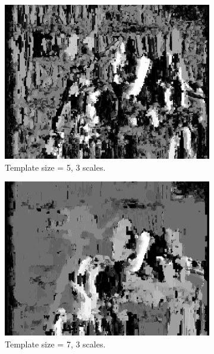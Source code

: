 \documentclass[12pt,a4paper,oneside,final]{article}
\begin{document}
\begin{figure}[H]
\ContinuedFloat
\begin{subfigure}[b]{0.24\textwidth}
	\includegraphics[width=\textwidth]{disparity_s3_k5set_1.png}
	\caption{Template size = 5, 3 scales.}
\end{subfigure}
\begin{subfigure}[b]{0.24\textwidth}
	\includegraphics[width=\textwidth]{disparity_s3_k7set_1.png}
	\caption{Template size = 7, 3 scales.}
\end{subfigure}
\begin{subfigure}[b]{0.24\textwidth}

\end{subfigure}
\end{figure}
\end{document}
